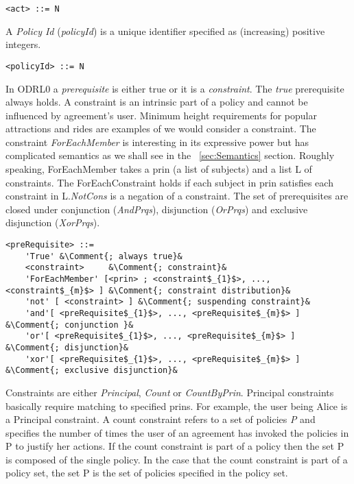 \lstset{mathescape, language=AST}  
\begin{lstlisting}[frame=single, caption={act},label={lst:actast}]
<act> ::= N
\end{lstlisting}

A \emph{Policy Id} (\emph{policyId}) is a unique identifier specified as (increasing) positive integers. 

\lstset{mathescape, language=AST}  
\begin{lstlisting}[frame=single, caption={policyId},label={lst:policyIdast}]
<policyId> ::= N
\end{lstlisting}

In ODRL0 a \emph{prerequisite} is either true or it is a \emph{constraint}. The \emph{true} prerequisite always holds. A constraint is an intrinsic part of a policy and cannot be influenced by agreement's user. Minimum height requirements for popular attractions and rides are examples of we would consider a constraint. The constraint \emph{ForEachMember} is interesting in its expressive power but has complicated semantics as we shall see in the ~\ref{sec:Semantics} section. Roughly speaking, ForEachMember takes a prin (a list of subjects) and a list L of constraints. The ForEachConstraint holds if each subject in prin satisfies each constraint in L.\emph{NotCons} is a negation of a constraint. The set of prerequisites are closed under conjunction (\emph{AndPrqs}), disjunction (\emph{OrPrqs}) and exclusive disjunction (\emph{XorPrqs}).


\lstset{mathescape, language=AST, escapechar=\&}  
\begin{lstlisting}[frame=single, caption={preRequisite},label={lst:preRequisiteast}]
<preRequisite> ::=  
	'True' &\Comment{; always true}&
	<constraint>	 &\Comment{; constraint}&
	'ForEachMember' [<prin> ; <constraint$_{1}$>, ..., <constraint$_{m}$> ]	&\Comment{; constraint distribution}&
	'not' [ <constraint> ] &\Comment{; suspending constraint}&
	'and'[ <preRequisite$_{1}$>, ..., <preRequisite$_{m}$> ] &\Comment{; conjunction }&
	'or'[ <preRequisite$_{1}$>, ..., <preRequisite$_{m}$> ] &\Comment{; disjunction}&
	'xor'[ <preRequisite$_{1}$>, ..., <preRequisite$_{m}$> ] &\Comment{; exclusive disjunction}&
\end{lstlisting}

Constraints are either \emph{Principal}, \emph{Count} or \emph{CountByPrin}. Principal constraints basically require matching to specified prins. For example, the user being Alice is a Principal constraint. A count constraint refers to a set of policies \emph{P} and specifies the number of times the user of an agreement has invoked the policies in P to justify her actions. If the count constraint is part of a policy then the set P is composed of the single policy. In the case that the count constraint is part of a policy set, the set P is the set of policies specified in the policy set.

